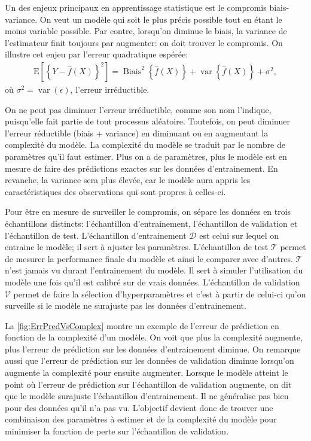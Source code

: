 Un des enjeux principaux en apprentissage statistique est le compromis biais-variance. On veut un modèle qui soit le plus précis possible tout en étant le moins variable possible. Par contre, lorsqu'on diminue le biais, la variance de l'estimateur finit toujours par augmenter: on doit trouver le compromis. On illustre cet enjeu par l'erreur quadratique espérée:
\begin{align*}\mathrm{E}\left[\left\{Y-\hat{f}\left(X\right)\right\}^{2}\right]=\operatorname{Biais}^{2}\left\{\hat{f}\left(X\right)\right\}+\operatorname{var}\left\{\hat{f}\left(X\right)\right\}+ \sigma^{2},
\end{align*}
où $\sigma^2=\operatorname{var}\left(\epsilon\right)$, l'erreur irréductible.

On ne peut pas diminuer l'erreur irréductible, comme son nom l'indique, puisqu'elle fait partie de tout processus aléatoire. Toutefois, on peut diminuer l'erreur réductible (biais + variance) en diminuant ou en augmentant la complexité du modèle. La complexité du modèle se traduit par le nombre de paramètres qu'il faut estimer. Plus on a de paramètres, plus le modèle est en mesure de faire des prédictions exactes sur les données d'entrainement. En revanche, la variance sera plus élevée, car le modèle aura appris les caractéristiques  des observations qui sont propres à celles-ci. 

Pour être en mesure de surveiller le compromis, on sépare les données en trois échantillons distincts: l'échantillon d'entrainement, l'échantillon de validation et l'échantillon de test. L'échantillon d'entrainement $\mathcal{D}$ est celui sur lequel on entraine le modèle; il sert à ajuster les paramètres. L'échantillon de test $\mathcal{T}$ permet de mesurer la performance finale du modèle et ainsi le comparer avec d'autres. $\mathcal{T}$ n'est jamais vu durant l'entrainement du modèle. Il sert à simuler l'utilisation du modèle une fois qu'il est calibré sur de vrais données.  L'échantillon de validation $\mathcal{V}$ permet de faire la sélection d'hyperparamètres et c'est à partir de celui-ci qu'on surveille si le modèle ne surajuste pas les données d'entrainement. 



La \autoref{fig:ErrPredVsComplex} montre un exemple de l'erreur de prédiction en fonction de la complexité d'un modèle. On voit que plus la complexité augmente, plus l'erreur de prédiction sur les données d'entrainement diminue. On remarque aussi que l'erreur de prédiction sur les données de validation diminue lorsqu'on augmente la complexité pour ensuite augmenter.%
Lorsque le modèle atteint le point où l'erreur de prédiction sur l'échantillon de validation augmente, on dit que le modèle surajuste l'échantillon d'entrainement. Il ne généralise pas bien pour des données qu'il n'a pas vu. L'objectif devient donc de trouver une combinaison des paramètres à estimer et de la complexité du modèle pour minimiser la fonction de perte sur l'échantillon de validation.

